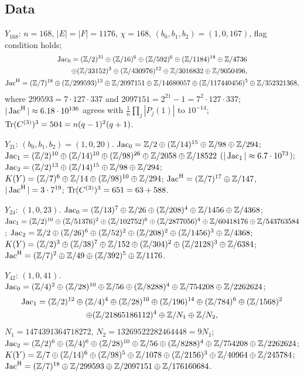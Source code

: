 \subsection*{Data}
$Y_{168}$: $n=168$, $|E|=|F|=1176$, $\chi=168$, $(b_0,b_1,b_2)=(1,0,167)$, flag condition
holds;
\begin{gather*}
\operatorname{Jac}_0=(\mathbb{Z}/2)^{31}\oplus(\mathbb{Z}/16)^{6}\oplus(\mathbb{Z}/592)^{6}\oplus(\mathbb{Z}/1184)^{18}\oplus\mathbb{Z}/4736\\
\qquad\oplus(\mathbb{Z}/33152)^{3}\oplus(\mathbb{Z}/430976)^{12}\oplus\mathbb{Z}/3016832\oplus\mathbb{Z}/9050496,\\
\operatorname{Jac}^{\mathrm{H}}=(\mathbb{Z}/7)^{18}\oplus(\mathbb{Z}/299593)^{13}\oplus\mathbb{Z}/2097151\oplus\mathbb{Z}/14680057\oplus
(\mathbb{Z}/117440456)^{5}\oplus\mathbb{Z}/352321368,
\end{gather*}
where $299593=7\cdot127\cdot337$ and $2097151=2^{21}-1=7^{2}\cdot127\cdot337$;
$|\operatorname{Jac}^{\mathrm{H}}|\approx6.18\cdot10^{136}$ agrees with $\frac1n\prod_j|P_j(1)|$ to $10^{-14}$;
$\operatorname{Tr}(C^{(3)})^{3}=504=n(q-1)^{2}(q+1)$.

$Y_{21}$: $(b_0,b_1,b_2)=(1,0,20)$. $\operatorname{Jac}_0=\mathbb{Z}/2\oplus(\mathbb{Z}/14)^{15}\oplus\mathbb{Z}/98\oplus\mathbb{Z}/294$;
$\operatorname{Jac}_1=(\mathbb{Z}/2)^{10}\oplus(\mathbb{Z}/14)^{10}\oplus(\mathbb{Z}/98)^{26}\oplus\mathbb{Z}/2058\oplus\mathbb{Z}/18522$
($|\operatorname{Jac}_1|\approx6.7\cdot10^{73}$); $\operatorname{Jac}_2=(\mathbb{Z}/2)^{13}\oplus(\mathbb{Z}/14)^{15}\oplus\mathbb{Z}/98\oplus\mathbb{Z}/294$;
$K(Y)=(\mathbb{Z}/7)^{6}\oplus\mathbb{Z}/14\oplus(\mathbb{Z}/98)^{10}\oplus\mathbb{Z}/294$;
$\operatorname{Jac}^{\mathrm{H}}=(\mathbb{Z}/7)^{17}\oplus\mathbb{Z}/147$, $|\operatorname{Jac}^{\mathrm{H}}|=3\cdot7^{19}$; $\operatorname{Tr}(C^{(3)})^{3}=651=63+588$.

$Y_{24}$: $(1,0,23)$. $\operatorname{Jac}_0=(\mathbb{Z}/13)^{7}\oplus\mathbb{Z}/26\oplus(\mathbb{Z}/208)^{4}\oplus\mathbb{Z}/1456\oplus\mathbb{Z}/4368$;
$\operatorname{Jac}_1=(\mathbb{Z}/2)^{10}\oplus(\mathbb{Z}/51376)^{2}\oplus(\mathbb{Z}/102752)^{6}\oplus(\mathbb{Z}/2877056)^{4}\oplus
\mathbb{Z}/60418176\oplus\mathbb{Z}/543763584$; $\operatorname{Jac}_2=\mathbb{Z}/2\oplus(\mathbb{Z}/26)^{6}\oplus(\mathbb{Z}/52)^{2}\oplus(\mathbb{Z}/208)^{2}
\oplus(\mathbb{Z}/1456)^{3}\oplus\mathbb{Z}/4368$; $K(Y)=(\mathbb{Z}/2)^{3}\oplus(\mathbb{Z}/38)^{7}\oplus\mathbb{Z}/152\oplus(\mathbb{Z}/304)^{2}
\oplus(\mathbb{Z}/2128)^{3}\oplus\mathbb{Z}/6384$; $\operatorname{Jac}^{\mathrm{H}}=(\mathbb{Z}/7)^{2}\oplus\mathbb{Z}/49\oplus(\mathbb{Z}/392)^{5}\oplus\mathbb{Z}/1176$.

$Y_{42}$: $(1,0,41)$. $\operatorname{Jac}_0=(\mathbb{Z}/4)^{2}\oplus(\mathbb{Z}/28)^{10}\oplus\mathbb{Z}/56\oplus(\mathbb{Z}/8288)^{4}\oplus
\mathbb{Z}/754208\oplus\mathbb{Z}/2262624$;
\begin{gather*}
\operatorname{Jac}_1=(\mathbb{Z}/2)^{12}\oplus(\mathbb{Z}/4)^{4}\oplus(\mathbb{Z}/28)^{10}\oplus(\mathbb{Z}/196)^{14}\oplus(\mathbb{Z}/784)^{6}
\oplus(\mathbb{Z}/1568)^{2}\\
\oplus(\mathbb{Z}/21865186112)^{4}\oplus\mathbb{Z}/N_1\oplus\mathbb{Z}/N_2 ,
\end{gather*}
$N_1=1474391364718272$, $N_2=13269522282464448=9N_1$;
$\operatorname{Jac}_2=(\mathbb{Z}/2)^{6}\oplus(\mathbb{Z}/4)^{6}\oplus(\mathbb{Z}/28)^{10}\oplus\mathbb{Z}/56\oplus
(\mathbb{Z}/8288)^{4}\oplus\mathbb{Z}/754208\oplus\mathbb{Z}/2262624$; $K(Y)=\mathbb{Z}/7\oplus(\mathbb{Z}/14)^{6}\oplus(\mathbb{Z}/98)^{5}\oplus
\mathbb{Z}/1078\oplus(\mathbb{Z}/2156)^{3}\oplus\mathbb{Z}/40964\oplus\mathbb{Z}/245784$;
$\operatorname{Jac}^{\mathrm{H}}=(\mathbb{Z}/7)^{18}\oplus\mathbb{Z}/299593\oplus\mathbb{Z}/2097151\oplus\mathbb{Z}/176160684$.

